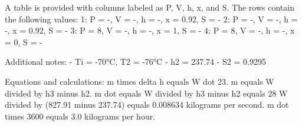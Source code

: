 A table is provided with columns labeled as P, V, h, x, and S. The rows contain the following values:  
1: P = -, V = -, h = -, x = 0.92, S = -  
2: P = -, V = -, h = -, x = 0.92, S = -  
3: P = 8, V = -, h = -, x = 1, S = -  
4: P = 8, V = -, h = -, x = 0, S = -  

Additional notes:  
- Ti = -70°C, T2 = -76°C  
- h2 = 237.74  
- S2 = 0.9295  

Equations and calculations:  
m times delta h equals W dot 23.  
m equals W divided by h3 minus h2.  
m dot equals W divided by h3 minus h2 equals 28 W divided by (827.91 minus 237.74) equals 0.008634 kilograms per second.  
m dot times 3600 equals 3.0 kilograms per hour.